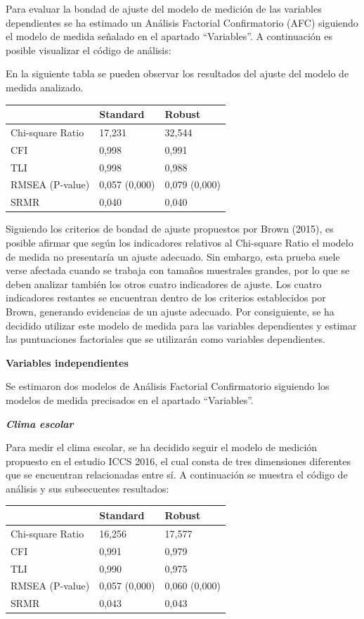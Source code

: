 \documentclass[12pt,twoside]{templates/facsothesis}
\begin{document}
Para evaluar la bondad de ajuste del modelo de medición de las variables dependientes se ha estimado un Análisis Factorial Confirmatorio (AFC) siguiendo el modelo de medida señalado en el apartado ``Variables''. A continuación es posible visualizar el código de análisis:

En la siguiente tabla se pueden observar los resultados del ajuste del modelo de medida analizado.

\begin{longtable}[]{@{}lll@{}}
\toprule
& Standard & Robust \\
\midrule
\endhead
Chi-square Ratio & 17,231 & 32,544 \\
CFI & 0,998 & 0,991 \\
TLI & 0,998 & 0,988 \\
RMSEA (P-value) & 0,057 (0,000) & 0,079 (0,000) \\
SRMR & 0,040 & 0,040 \\
\bottomrule
\end{longtable}

Siguiendo los criterios de bondad de ajuste propuestos por Brown (2015), es posible afirmar que según los indicadores relativos al Chi-square Ratio el modelo de medida no presentaría un ajuste adecuado. Sin embargo, esta prueba suele verse afectada cuando se trabaja con tamaños muestrales grandes, por lo que se deben analizar también los otros cuatro indicadores de ajuste. Los cuatro indicadores restantes se encuentran dentro de los criterios establecidos por Brown, generando evidencias de un ajuste adecuado. Por consiguiente, se ha decidido utilizar este modelo de medida para las variables dependientes y estimar las puntuaciones factoriales que se utilizarán como variables dependientes.

\textbf{Variables independientes}

Se estimaron dos modelos de Análisis Factorial Confirmatorio siguiendo los modelos de medida precisados en el apartado ``Variables''.

\textbf{\emph{Clima escolar}}

Para medir el clima escolar, se ha decidido seguir el modelo de medición propuesto en el estudio ICCS 2016, el cual consta de tres dimensiones diferentes que se encuentran relacionadas entre sí. A continuación se muestra el código de análisis y sus subsecuentes resultados:

\begin{longtable}[]{@{}lll@{}}
\toprule
& Standard & Robust \\
\midrule
\endhead
Chi-square Ratio & 16,256 & 17,577 \\
CFI & 0,991 & 0,979 \\
TLI & 0,990 & 0,975 \\
RMSEA (P-value) & 0,057 (0,000) & 0,060 (0,000) \\
SRMR & 0,043 & 0,043 \\
\bottomrule
\end{longtable}
\end{document}

